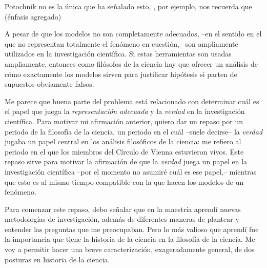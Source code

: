 Potochnik no es la única que ha señalado esto,
\textcite[][p.24]{abrams2023evolution}, por ejemplo, nos recuerda que  (énfasis agregado)

A pesar de que los modelos no son completamente adecuados, --en el sentido en el que no representan totalmente el fenómeno en cuestión,-- son ampliamente utilizados en la investigación científica.
Si estas herramientas son usadas ampliamente, entonces como filósofos de la ciencia hay que ofrecer un análisis de cómo exactamente los modelos sirven para justificar hipótesis si parten de supuestos obviamente falsos.

Me parece que buena parte del problema está relacionado con determinar cuál es el papel que juega la \emph{representación adecuada} y la \emph{verdad} en la investigación científica.
Para motivar mi afirmación anterior, quiero dar un repaso por un periodo de la filosofía de la ciencia, un periodo en el cuál --suele decirse-- la \emph{verdad} jugaba un papel central en los análisis filosóficos de la ciencia: me refiero al periodo en el que los miembros del Círculo de Vienna estuvieron vivos.
Este repaso sirve para motivar la afirmación de que la \emph{verdad} juega un papel en la investigación científica --por el momento no asumiré cuál es ese papel,-- mientras que esto es al mismo tiempo compatible con la  que hacen los modelos de un fenómeno.

Para comenzar este repaso, debo señalar que en la maestría aprendí nuevas metodologías de investigación, además de diferentes maneras de plantear y entender las preguntas que me preocupaban.
Pero lo más valioso que aprendí fue la importancia que tiene la historia de la ciencia en la filosofía de la ciencia.
Me voy a permitir hacer una breve caracterización, exageradamente general, de dos posturas en historia de la ciencia.
